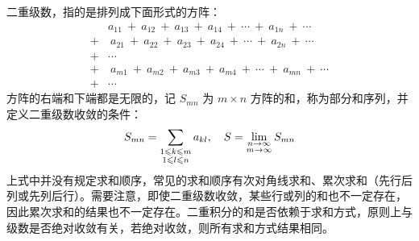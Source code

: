 \documentclass[UTF8]{report}
\theoremstyle{MyLineTheoremStyle} %
\theoremstyle{MyBlockTheoremStyle} %
\theoremstyle{MySubsubsectionStyle} %
\begin{document}
二重级数，指的是排列成下面形式的方阵：
\begin{equation}
    \begin{aligned}
        &a_{11}\:+\:a_{12}\:+\:a_{13}\:+\:a_{14}\:+\:\cdots\:+\:a_{1n}\:+\:\cdots  \\
        +&\:a_{21}\:+\:a_{22}\:+\:a_{23}\:+\:a_{24}\:+\:\cdots\:+\:a_{2n}\:+\:\cdots  \\
        +&\cdots  \\
        +&\:a_{m1}\:+\:a_{m2}\:+\:a_{m3}\:+\:a_{m4}\:+\:\cdots\:+\:a_{mn}\:+\:\cdots  \\
        +&\cdots 
    \end{aligned}
\end{equation}
方阵的右端和下端都是无限的，记 $S_{mn}$ 为 $m\times n$ 方阵的和，称为部分和序列，并定义二重级数收敛的条件：
\begin{equation}
    S_{m n} = \sum_{\begin{subarray}{c} 1 \leqslant k \leqslant m \\ 1 \leqslant l \leqslant n \end{subarray}} a_{k l},\quad S = \lim_{\begin{subarray}{c} n \to \infty \\ m \to \infty \end{subarray}} S_{m n}
\end{equation}
上式中并没有规定求和顺序，常见的求和顺序有次对角线求和、累次求和（先行后列或先列后行）。需要注意，即使二重级数收敛，某些行或列的和也不一定存在，因此累次求和的结果也不一定存在。二重积分的和是否依赖于求和方式，原则上与级数是否绝对收敛有关，若绝对收敛，则所有求和方式结果相同。














\nocite{*}

\thispagestyle{fancy} 




\newpage
\appendix
\titleformat{\chapter}[hang]{\normalfont\huge\bfseries\centering}{}{20pt}{}
\titlespacing*{\chapter}{0pt}{-25pt}{8pt} %
\titleformat{\section}[hang]{\normalfont\centering\Large\bfseries}{\thesection}{8pt}{}
\end{document}
